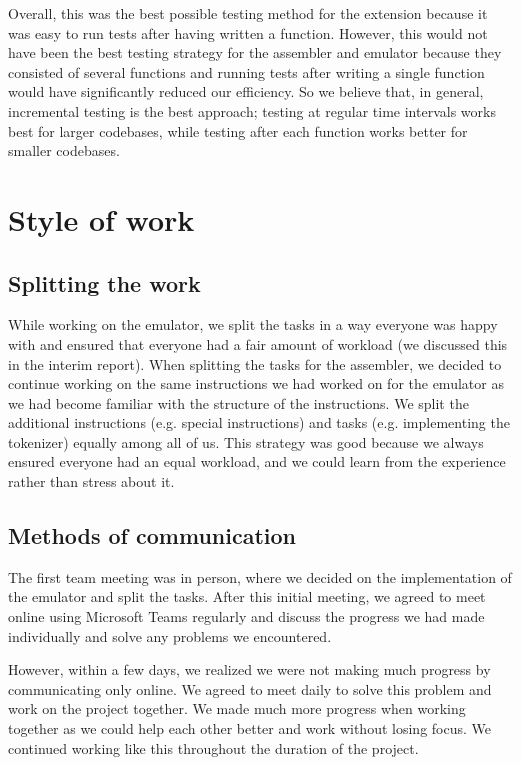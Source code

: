 \documentclass[11pt]{article}
\begin{document}
Overall, this was the best possible testing method for the extension because it was easy to run tests after having written a function. However, this would not have been the best testing strategy for the assembler and emulator because they consisted of several functions and running tests after writing a single function would have significantly reduced our efficiency. So we believe that, in general, incremental testing is the best approach; testing at regular time intervals works best for larger codebases, while testing after each function works better for smaller codebases.

\section{Style of work}
\subsection{Splitting the work}
\-\hspace{0.6cm}While working on the emulator, we split the tasks in a way everyone was happy with and ensured that everyone had a fair amount of workload (we discussed this in the interim report). When splitting the tasks for the assembler, we decided to continue working on the same instructions we had worked on for the emulator as we had become familiar with the structure of the instructions. We split the additional instructions (e.g. special instructions) and tasks (e.g. implementing the tokenizer) equally among all of us. This strategy was good because we always ensured everyone had an equal workload, and we could learn from the experience rather than stress about it. 

\subsection{Methods of communication}
\-\hspace{0.6cm}The first team meeting was in person, where we decided on the implementation of the emulator and split the tasks. After this initial meeting, we agreed to meet online using Microsoft Teams regularly and discuss the progress we had made individually and solve any problems we encountered. 

However, within a few days, we realized we were not making much progress by communicating only online. We agreed to meet daily to solve this problem and work on the project together. We made much more progress when working together as we could help each other better and work without losing focus. We continued working like this throughout the duration of the project. 
\end{document}
